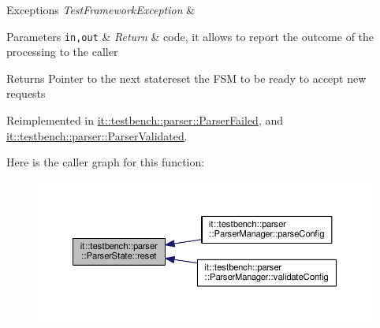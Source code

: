 \begin{DoxyExceptions}{Exceptions}
{\em Test\-Framework\-Exception} & \\
\hline
\end{DoxyExceptions}

\begin{DoxyParams}[1]{Parameters}
\mbox{\tt in,out}  & {\em Return} & code, it allows to report the outcome of the processing to the caller\\
\hline
\end{DoxyParams}
\begin{DoxyReturn}{Returns}
Pointer to the next statereset the F\-S\-M to be ready to accept new requests 
\end{DoxyReturn}


Reimplemented in \hyperlink{classit_1_1testbench_1_1parser_1_1ParserFailed_afbafaf9663402f5b87aadc8540b358d8}{it\-::testbench\-::parser\-::\-Parser\-Failed}, and \hyperlink{classit_1_1testbench_1_1parser_1_1ParserValidated_a893e95379726032278abcf9f2a1bfd0e}{it\-::testbench\-::parser\-::\-Parser\-Validated}.



Here is the caller graph for this function\-:
\nopagebreak
\begin{figure}[H]
\begin{center}
\leavevmode
\includegraphics[width=350pt]{db/d52/classit_1_1testbench_1_1parser_1_1ParserState_ac484747e6178b71b937eec45265fb4a7_icgraph}
\end{center}
\end{figure}


